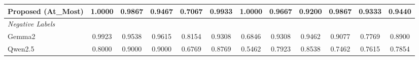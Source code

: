 \begin{table}[h!]
{\begin{tabular}{lcccccccccc||c}
            Proposed (At\_Most)                & 1.0000                                                  & 0.9867                                                  & 0.9467                                                  & 0.7067                                                            & 0.9933                                                  & 1.0000                                                    & 0.9667                                                            & 0.9200                                                  & 0.9867                                 & 0.9333                                   & 0.9440 \\
            \hline
            \textit{Negative Labels}           &                                                         &                                                         &                                                         &                                                                   &                                                          &                                                           &                                                                  &                                                         &                                        &                                          &       \\
            Gemma2                             & 0.9923                                                  & 0.9538                                                  & 0.9615                                                  & 0.8154                                                            & 0.9308                                                  & 0.6846                                                    & 0.9308                                                            & 0.9462                                                  & 0.9077                                 & 0.7769                                   & 0.8900 \\
            Qwen2.5                            & 0.8000                                                  & 0.9000                                                  & 0.9000                                                  & 0.6769                                                            & 0.8769                                                  & 0.5462                                                    & 0.7923                                                            & 0.8538                                                  & 0.7462                                 & 0.7615                                   & 0.7854 \\

\end{tabular}}
\end{table}
